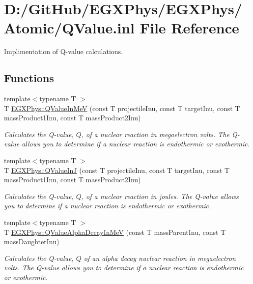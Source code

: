 \hypertarget{_q_value_8inl}{}\section{D\+:/\+Git\+Hub/\+E\+G\+X\+Phys/\+E\+G\+X\+Phys/\+Atomic/\+Q\+Value.inl File Reference}
\label{_q_value_8inl}


Implimentation of Q-\/value calculations.  


\subsection*{Functions}
\begin{DoxyCompactItemize}
\item 
{\footnotesize template$<$typename T $>$ }\\T \mbox{\hyperlink{group___e_g_x_phys-_q_value_ga53f07ac44d3d3b217b8c5b7aa548e3fc}{E\+G\+X\+Phys\+::\+Q\+Value\+In\+MeV}} (const T projectile\+Inu, const T target\+Inu, const T mass\+Product1\+Inu, const T mass\+Product2\+Inu)
\begin{DoxyCompactList}\small\item\em Calculates the Q-\/value, $Q$, of a nuclear reaction in megaelectron volts. The Q-\/value allows you to determine if a nuclear reaction is endothermic or exothermic. \end{DoxyCompactList}\item 
{\footnotesize template$<$typename T $>$ }\\T \mbox{\hyperlink{group___e_g_x_phys-_q_value_gaa61414574096631a36ff857b311c435c}{E\+G\+X\+Phys\+::\+Q\+Value\+InJ}} (const T projectile\+Inu, const T target\+Inu, const T mass\+Product1\+Inu, const T mass\+Product2\+Inu)
\begin{DoxyCompactList}\small\item\em Calculates the Q-\/value, $Q$, of a nuclear reaction in joules. The Q-\/value allows you to determine if a nuclear reaction is endothermic or exothermic. \end{DoxyCompactList}\item 
{\footnotesize template$<$typename T $>$ }\\T \mbox{\hyperlink{group___e_g_x_phys-_q_value-_alpha_ga4f9a38d3ad4bf93471a0affb493b6e72}{E\+G\+X\+Phys\+::\+Q\+Value\+Alpha\+Decay\+In\+MeV}} (const T mass\+Parent\+Inu, const T mass\+Daughter\+Inu)
\begin{DoxyCompactList}\small\item\em Calculates the Q-\/value, $Q$ of an alpha decay nuclear reaction in megaelectron volts. The Q-\/value allows you to determine if a nuclear reaction is endothermic or exothermic. \end{DoxyCompactList}\item 

\end{DoxyCompactItemize}
